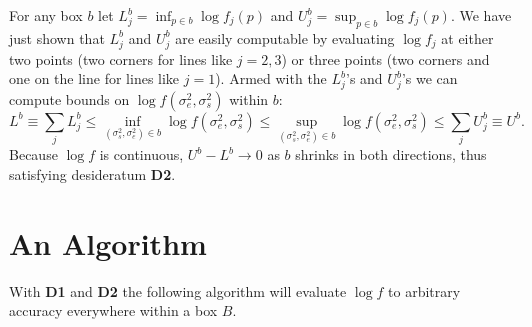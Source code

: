 \documentclass{report}
\newcommand{\RL}{f}
\newcommand{\logRL}{\log\RL}
\newcommand{\sigssq}{\sigma_s^2}
\newcommand{\sigesq}{\sigma_e^2}
\newcommand{\logRLss}{\logRL(\sigesq,\sigssq)}
\begin{document}
For any box $b$ let $L^b_j = \inf_{p\in b} \logRL_j(p)$ and $U^b_j = \sup_{p\in b} \logRL_j(p)$.  We have just shown that $L^b_j$ and $U^b_j$ are easily computable by evaluating $\logRL_j$ at either two points (two corners for lines like $j=2,3$) or three points (two corners and one on the line for lines like $j=1$).
Armed with the $L^b_j$'s and $U^b_j$'s we can compute bounds on $\logRLss$ within $b$:
\begin{equation}
	L^b \equiv \sum_j L^b_j \le \inf_{(\sigssq,\sigesq)\in b} \logRLss \le
	\sup_{(\sigssq,\sigesq)\in b} \logRLss \le \sum_j U^b_j \equiv U^b.
\label{eq:bounds}
\end{equation}
Because $\logRL$ is continuous, $U^b - L^b \rightarrow 0$ as $b$ shrinks in both directions, thus satisfying desideratum \textbf{D2}.

\section{An Algorithm}
With \textbf{D1} and \textbf{D2} the following  algorithm will evaluate $\logRL$ to arbitrary accuracy everywhere within a box $B$.
\end{document}
